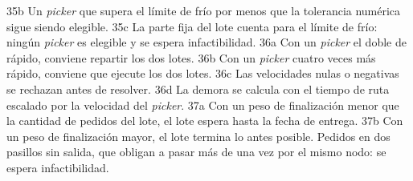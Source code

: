 	\bTR \bTD 35b \eTD \bTD Un {\em picker} que supera el límite de frío por menos que la tolerancia numérica sigue siendo elegible. \eTD \eTR
	\bTR \bTD 35c \eTD \bTD La parte fija del lote cuenta para el límite de frío: ningún {\em picker} es elegible y se espera infactibilidad. \eTD \eTR
	\bTR \bTD 36a \eTD \bTD Con un {\em picker} el doble de rápido, conviene repartir los dos lotes. \eTD \eTR
	\bTR \bTD 36b \eTD \bTD Con un {\em picker} cuatro veces más rápido, conviene que ejecute los dos lotes. \eTD \eTR
	\bTR \bTD 36c \eTD \bTD Las velocidades nulas o negativas se rechazan antes de resolver. \eTD \eTR
	\bTR \bTD 36d \eTD \bTD La demora se calcula con el tiempo de ruta escalado por la velocidad del {\em picker}. \eTD \eTR
	\bTR \bTD 37a \eTD \bTD Con un peso de finalización menor que la cantidad de pedidos del lote, el lote espera hasta la fecha de entrega. \eTD \eTR
	\bTR \bTD 37b \eTD \bTD Con un peso de finalización mayor, el lote termina lo antes posible. \eTD \eTR
	\bTR {} \eTD \bTD Pedidos en dos pasillos sin salida, que obligan a pasar más de una vez por el mismo nodo: se espera infactibilidad. \eTD \eTR
	\eTABLEbody
	\eTABLE
\stopplacetable

\stopchapter
